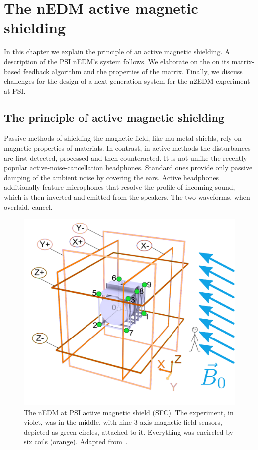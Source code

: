 \chapter{The nEDM active magnetic shielding}

\label{ch:nedm_sfc}
In this chapter we explain the principle of an active magnetic shielding. A description of the PSI nEDM's system follows. We elaborate on the on its matrix-based feedback algorithm and the properties of the matrix. Finally, we discuss challenges for the design of a next-generation system for the n2EDM experiment at PSI\@.




\section{The principle of active magnetic shielding}
Passive methods of shielding the magnetic field, like mu-metal shields, rely on magnetic properties of materials. In contrast, in active methods the disturbances are first detected, processed and then counteracted. It is not unlike the recently popular active-noise-cancellation headphones. Standard ones provide only passive damping of the ambient noise by covering the ears. Active headphones additionally feature microphones that resolve the profile of incoming sound, which is then inverted and emitted from the speakers. The two waveforms, when overlaid, cancel.

\begin{figure}
  \centering
  \includegraphics[width=0.8\linewidth]{gfx/nEDM_SFC/SFCplain.pdf}
  \caption{The nEDM at PSI active magnetic shield (SFC). The experiment, in violet, was in the middle, with nine 3-axis magnetic field sensors, depicted as green circles, attached to it. Everything was encircled by six coils (orange). Adapted from~\cite{Franke2013}.}\label{fig:sfc-scheme}
\end{figure}

